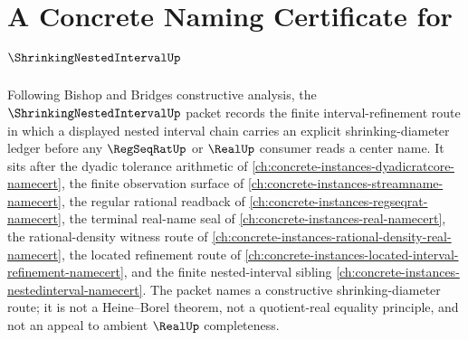 \chapter{A Concrete Naming Certificate for $\ShrinkingNestedIntervalUp$}
\label{ch:concrete-instances-shrinking-nested-interval-namecert}

Following Bishop and Bridges constructive analysis, the $\ShrinkingNestedIntervalUp$ packet records the finite interval-refinement route in which a displayed nested interval chain carries an explicit shrinking-diameter ledger before any $\RegSeqRatUp$ or $\RealUp$ consumer reads a center name. It sits after the dyadic tolerance arithmetic of \autoref{ch:concrete-instances-dyadicratcore-namecert}, the finite observation surface of \autoref{ch:concrete-instances-streamname-namecert}, the regular rational readback of \autoref{ch:concrete-instances-regseqrat-namecert}, the terminal real-name seal of \autoref{ch:concrete-instances-real-namecert}, the rational-density witness route of \autoref{ch:concrete-instances-rational-density-real-namecert}, the located refinement route of \autoref{ch:concrete-instances-located-interval-refinement-namecert}, and the finite nested-interval sibling \autoref{ch:concrete-instances-nestedinterval-namecert}. The packet names a constructive shrinking-diameter route; it is not a Heine--Borel theorem, not a quotient-real equality principle, and not an appeal to ambient $\RealUp$ completeness.

